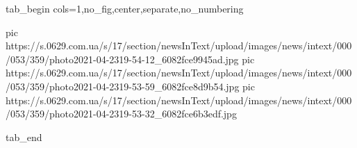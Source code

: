  
 
 
 
 


\ifcmt
  tab_begin cols=1,no_fig,center,separate,no_numbering

     pic https://s.0629.com.ua/s/17/section/newsInText/upload/images/news/intext/000/053/359/photo2021-04-2319-54-12_6082fce9945ad.jpg
     pic https://s.0629.com.ua/s/17/section/newsInText/upload/images/news/intext/000/053/359/photo2021-04-2319-53-59_6082fce8d9b54.jpg
     pic https://s.0629.com.ua/s/17/section/newsInText/upload/images/news/intext/000/053/359/photo2021-04-2319-53-32_6082fce6b3edf.jpg

  tab_end
\fi
